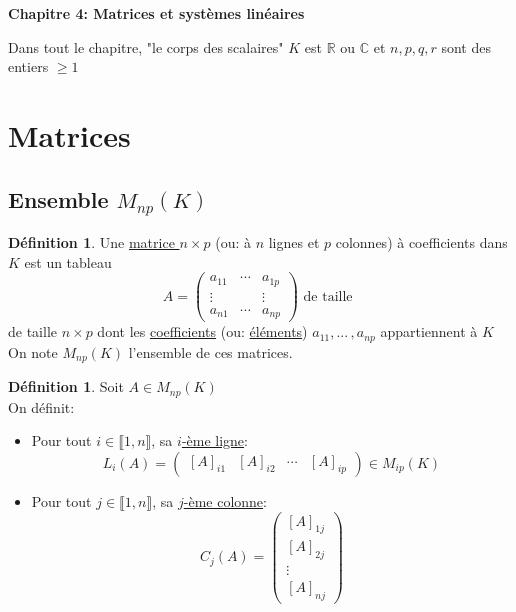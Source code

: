 \documentclass[10pt,a4paper]{article}
\theoremstyle{definition}
\newtheorem{definition}[proposition]{Définition}
\begin{document}
\renewcommand{\labelitemi}{$*$}
\renewcommand{\labelenumi}{(\roman{enumi})}
\begin{center}
{\Large \textbf{Chapitre 4: Matrices et systèmes linéaires}}
\end{center}
Dans tout le chapitre, "le corps des scalaires" $K$ est $\mathbb{R}$ ou $\mathbb{C}$ et $n, p, q, r$ sont des entiers $\geq 1$

\section{Matrices}
\subsection{Ensemble $M_{np}(K)$}
\begin{definition}
Une \uline{matrice $n \times p$} (ou: à $n$ lignes et $p$ colonnes) à coefficients dans $K$ est un tableau
\[ A = \begin{pmatrix}
a_{11} & \cdots & a_{1p} \\
\vdots & & \vdots \\
a_{n1} & \cdots & a_{np}
\end{pmatrix} \text{ de taille }\]
de taille $n \times p$ dont les \uline{coefficients} (ou: \uline{éléments}) $a_{11}, ...\,, a_{np}$ appartiennent à $K$ \\
On note $M_{np}(K)$ l'ensemble de ces matrices.
\end{definition}
\begin{definition}
Soit $A \in M_{np}(K)$ \\
On définit:
\begin{itemize}
\item Pour tout $i \in \llbracket 1, n \rrbracket$, sa \uline{$i$-ème ligne}:
\[L_i(A) = \begin{pmatrix}
[A]_{i1} & [A]_{i2} & \cdots & [A]_{ip}
\end{pmatrix} \in M_{ip}(K) \]
\item Pour tout $j \in \llbracket 1, n \rrbracket$, sa \uline{$j$-ème colonne}:
\[ C_j(A) = \begin{pmatrix}
[A]_{1j} \\
[A]_{2j} \\
\vdots \\
[A]_{nj}
\end{pmatrix} \]
\end{itemize}
\end{definition}
\end{document}
